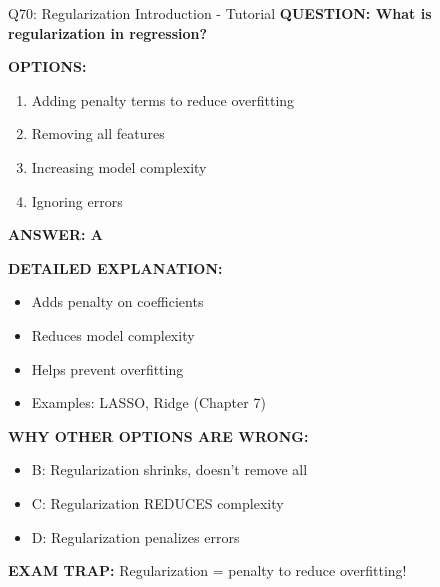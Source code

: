 \documentclass[8pt]{beamer}
\begin{document}
	\begin{frame}{Q70: Regularization Introduction - Tutorial}
		\fontsize{6.5}{7.5}\selectfont
		\textbf{QUESTION: What is regularization in regression?}
		
		\vspace{0.1cm}
		\textbf{OPTIONS:}
		\begin{enumerate}
			\item Adding penalty terms to reduce overfitting
			\item Removing all features
			\item Increasing model complexity
			\item Ignoring errors
		\end{enumerate}
		
		\vspace{0.1cm}
		\textcolor{myblue}{\textbf{ANSWER: A}}
		
		\vspace{0.1cm}
		\textbf{DETAILED EXPLANATION:}
		\begin{itemize}
			\item Adds penalty on coefficients
			\item Reduces model complexity
			\item Helps prevent overfitting
			\item Examples: LASSO, Ridge (Chapter 7)
		\end{itemize}
		
		\vspace{0.1cm}
		\textcolor{myred}{\textbf{WHY OTHER OPTIONS ARE WRONG:}}
		\begin{itemize}
			\item \textcolor{myred}{B:} Regularization shrinks, doesn't remove all
			\item \textcolor{myred}{C:} Regularization REDUCES complexity
			\item \textcolor{myred}{D:} Regularization penalizes errors
		\end{itemize}
		
		\textcolor{myred}{\textbf{EXAM TRAP:}} Regularization = \textcolor{myblue}{penalty to reduce overfitting}!
	\end{frame}
	
	
\end{document}
